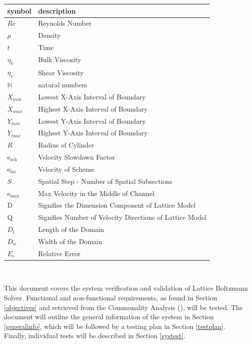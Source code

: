 \documentclass[12pt, titlepage]{article}
\newcommand{\myprogname}{Lattice Boltzmann Solver}
\begin{document}
\renewcommand{\arraystretch}{1.2}
\begin{tabular}{l l} 
  \toprule		
  \textbf{symbol} & \textbf{description}\\
  \midrule 
  $Re$ & Reynolds Number\\
  $\rho$ & Density \\
  $t$ & Time \\
  $\eta_b$ & Bulk Viscosity \\
  $\eta_s$ & Shear Viscosity \\
  $\mathbb{N}$ & natural numbers\\
  $X_{min}$ & Lowest X-Axis Interval of Boundary\\
  $X_{max}$ & Highest X-Axis Interval of Boundary\\
  $Y_{min}$ & Lowest Y-Axis Interval of Boundary\\
  $Y_{max}$ & Highest Y-Axis Interval of Boundary\\
  $R$ & Radius of Cylinder\\
  $\mathrm{e_{sch}}$ & Velocity Slowdown Factor\\
  $\mathrm{e_{fac}}$ & Velocity of Scheme\\
  $S$ & Spatial Step - Number of Spatial Subsections\\
  $\mathrm{e_{max}}$ & Max Velocity in the Middle of Channel\\
  $\mathrm{D}$ & Signifies the Dimension Component of Lattice Model\\
  $\mathrm{Q}$ & Signifies Number of Velocity Directions of Lattice Model\\
  $D_{l}$ & Length of the Domain\\
  $D_{w}$ & Width of the Domain\\
  $E_r$ & Relative Error\\
  \bottomrule
\end{tabular}\\

\newpage


\noindent This document covers the system verification and validation of \myprogname . Functional and non-functional requirements, as found in Section \ref{objectives} and retrieved from the Commonality Analysis (\citet{LBM_CA_PM}), will be tested. The document will outline the general information of the system in Section \ref{generalinfo}, which will be followed by a testing plan in Section \ref{testplan}. Finally, individual tests will be described in Section \ref{systest}. 
\end{document}
